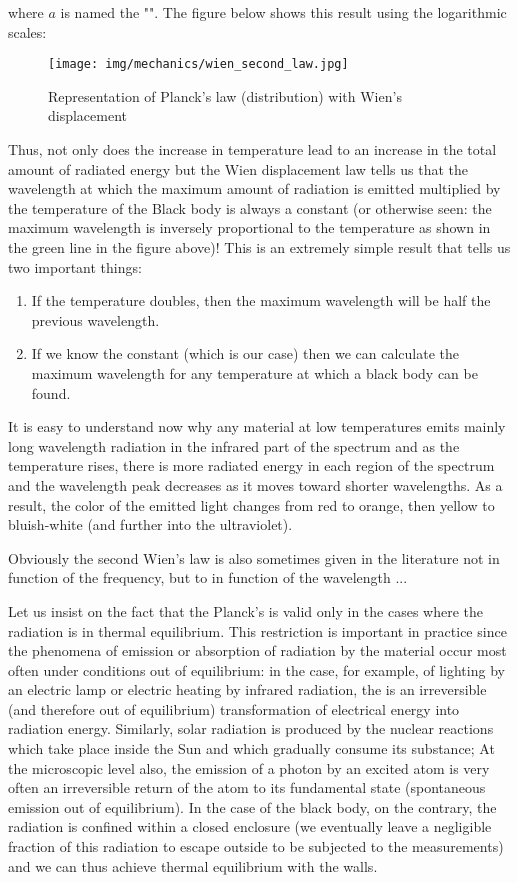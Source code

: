 	where $a$ is named the "". The figure below shows this result using the logarithmic scales:
	\begin{figure}[H]
		\centering
		\texttt{[image: img/mechanics/wien\_second\_law.jpg]}
		\caption{Representation of Planck's law (distribution) with Wien's displacement}
	\end{figure}
	Thus, not only does the increase in temperature lead to an increase in the total amount of radiated energy but the Wien displacement law tells us that the wavelength at which the maximum amount of radiation is emitted multiplied by the temperature of the Black body is always a constant (or otherwise seen: the maximum wavelength is inversely proportional to the temperature as shown in the green line in the figure above)! This is an extremely simple result that tells us two important things:
	\begin{enumerate}
		\item If the temperature doubles, then the maximum wavelength will be half the previous wavelength.

		\item If we know the constant (which is our case) then we can calculate the maximum wavelength for any temperature at which a black body can be found.
	\end{enumerate}
	It is easy to understand now why any material at low temperatures emits mainly long wavelength radiation in the infrared part of the spectrum and as the temperature rises, there is more radiated energy in each region of the spectrum and the wavelength peak decreases as it moves toward shorter wavelengths. As a result, the color of the emitted light changes from red to orange, then yellow to bluish-white (and further into the ultraviolet).
	\begin{tcolorbox}[title=Remark,colframe=black,arc=10pt]
	Obviously the second Wien's law is also sometimes given in the literature not in function of the frequency, but to in function of the wavelength ...
	\end{tcolorbox}
	Let us insist on the fact that the Planck's is valid only in the cases where the radiation is in thermal equilibrium. This restriction is important in practice since the phenomena of emission or absorption of radiation by the material occur most often under conditions out of equilibrium: in the case, for example, of lighting by an electric lamp or electric heating by infrared radiation, the is an irreversible (and therefore out of equilibrium) transformation of electrical energy into radiation energy. Similarly, solar radiation is produced by the nuclear reactions which take place inside the Sun and which gradually consume its substance; At the microscopic level also, the emission of a photon by an excited atom is very often an irreversible return of the atom to its fundamental state (spontaneous emission out of equilibrium). In the case of the black body, on the contrary, the radiation is confined within a closed enclosure (we eventually leave a negligible fraction of this radiation to escape outside to be subjected to the measurements) and we can thus achieve thermal equilibrium with the walls.

